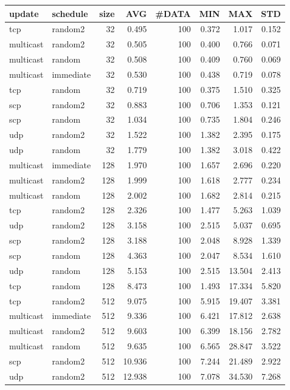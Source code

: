 \begin{tabular}{|llrrrrrr|}
\hline
{\sc update}&{\sc schedule}&{\sc size}&{\sc AVG}&{\sc\#DATA}&{\sc MIN}&{\sc MAX}&{\sc STD}\\
\hline
tcp & random2 & 32 &  0.495 & 100 & 0.372 & 1.017 & 0.152\\
multicast & random2 & 32 &  0.505 & 100 & 0.400 & 0.766 & 0.071\\
multicast & random & 32 &  0.508 & 100 & 0.409 & 0.760 & 0.069\\
multicast & immediate & 32 &  0.530 & 100 & 0.438 & 0.719 & 0.078\\
tcp & random & 32 &  0.719 & 100 & 0.375 & 1.510 & 0.325\\
scp & random2 & 32 &  0.883 & 100 & 0.706 & 1.353 & 0.121\\
scp & random & 32 &  1.034 & 100 & 0.735 & 1.804 & 0.246\\
udp & random2 & 32 &  1.522 & 100 & 1.382 & 2.395 & 0.175\\
udp & random & 32 &  1.779 & 100 & 1.382 & 3.018 & 0.422\\
multicast & immediate & 128 &  1.970 & 100 & 1.657 & 2.696 & 0.220\\
multicast & random2 & 128 &  1.999 & 100 & 1.618 & 2.777 & 0.234\\
multicast & random & 128 &  2.002 & 100 & 1.682 & 2.814 & 0.215\\
tcp & random2 & 128 &  2.326 & 100 & 1.477 & 5.263 & 1.039\\
udp & random2 & 128 &  3.158 & 100 & 2.515 & 5.037 & 0.695\\
scp & random2 & 128 &  3.188 & 100 & 2.048 & 8.928 & 1.339\\
scp & random & 128 &  4.363 & 100 & 2.047 & 8.534 & 1.610\\
udp & random & 128 &  5.153 & 100 & 2.515 & 13.504 & 2.413\\
tcp & random & 128 &  8.473 & 100 & 1.493 & 17.334 & 5.820\\
tcp & random2 & 512 &  9.075 & 100 & 5.915 & 19.407 & 3.381\\
multicast & immediate & 512 &  9.336 & 100 & 6.421 & 17.812 & 2.638\\
multicast & random2 & 512 &  9.603 & 100 & 6.399 & 18.156 & 2.782\\
multicast & random & 512 &  9.635 & 100 & 6.565 & 28.847 & 3.522\\
scp & random2 & 512 &  10.936 & 100 & 7.244 & 21.489 & 2.922\\
udp & random2 & 512 &  12.938 & 100 & 7.078 & 34.530 & 7.268\\

\end{tabular}
